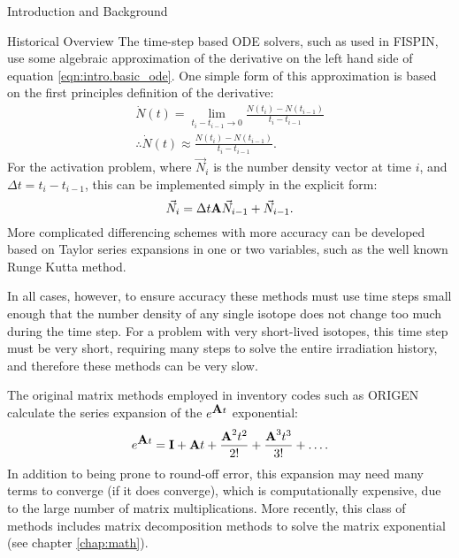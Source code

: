 \begin{chapter}{Introduction and Background}
\begin{section}{Historical Overview}
    The time-step based ODE solvers, such as used in
    FISPIN\cite{FISPIN}, use some algebraic approximation of the
    derivative on the left hand side of equation
    \ref{eqn:intro.basic_ode}.  One simple form of this approximation
    is based on the first principles definition of the derivative:
    \begin{equation*}
      \begin{split}
        \dot{N}(t) = \lim_{t_i - t_{i-1} \rightarrow 0} \frac{N(t_i)
          - N(t_{i-1})}{t_i - t_{i-1}}\\
        \therefore \dot{N}(t) \approx \frac{N(t_i)
          - N(t_{i-1})}{t_i - t_{i-1}}.
      \end{split}
    \end{equation*}
    For the activation problem, where $\vec{N}_i$ is the number
    density vector at time $i$, and $\Delta t = t_i - t_{i-1}$, this
    can be implemented simply in the explicit form:
    \begin{equation}
      \label{eqn:intro.time-step}
      \vec{N}_i = \Delta t \mbox{$\mathbf{A}$}\vec{N}_{i-1} + \vec{N}_{i-1}.
    \end{equation}
    More complicated differencing schemes with more accuracy can be
    developed based on Taylor series expansions in one or two
    variables, such as the well known Runge Kutta method.
  
    In all cases, however, to ensure accuracy these methods must use
    time steps small enough that the number density of any single
    isotope does not change too much during the time step.  For a
    problem with very short-lived isotopes, this time step must be
    very short, requiring many steps to solve the entire irradiation
    history, and therefore these methods can be very slow.
  
    The original matrix methods employed in inventory codes such as
    ORIGEN\cite{ORIGEN} calculate the series expansion of the
    $e^{\mbox{$\mathbf{A}$}t}$ exponential:
    \begin{equation*}
      e^{\mbox{$\mathbf{A}$}t} = \mbox{$\mathbf{I}$} + \mbox{$\mathbf{A}$}t + \frac{\mbox{$\mathbf{A}$}^2t^2}{2!} +
      \frac{\mbox{$\mathbf{A}$}^3t^3}{3!} + \ldots .
    \end{equation*}
    In addition to being prone to round-off error, this expansion may
    need many terms to converge (if it does converge), which is
    computationally expensive, due to the large number of matrix
    multiplications.  More recently, this class of methods includes
    matrix decomposition methods to solve the matrix exponential (see
    chapter \ref{chap:math}).
  

\end{section}
\end{chapter}
